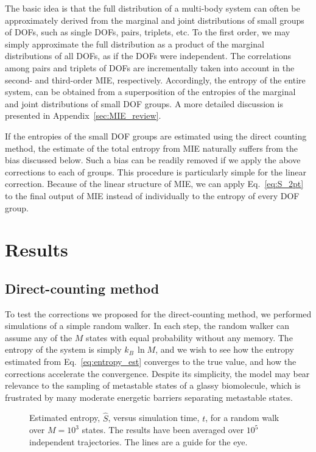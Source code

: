 \documentclass[reprint, superscriptaddress]{revtex4-1}
\begin{document}
The basic idea is that the full distribution of a multi-body system
can often be approximately derived
from the marginal and joint distributions of small groups of DOFs,
such as single DOFs, pairs, triplets, etc.
%
To the first order,
we may simply approximate the full distribution as a product
of the marginal distributions of all DOFs,
as if the DOFs were independent.
%
The correlations among pairs and triplets of DOFs
are incrementally taken into account in the second- and third-order MIE,
respectively.
%
Accordingly, the entropy of the entire system,
can be obtained from a superposition of the entropies
of the marginal and joint distributions
of small DOF groups.
%
A more detailed discussion is presented in Appendix~\ref{sec:MIE_review}.

If the entropies of the small DOF groups are estimated
using the direct counting method,
the estimate of the total entropy from MIE
naturally suffers from the bias discussed below.
%
Such a bias can be readily removed
if we apply the above corrections
to each of groups.
%
This procedure is particularly simple for the linear correction.
%
Because of the linear structure of MIE,
we can apply Eq.~\eqref{eq:S_2pt}
to the final output of MIE
instead of individually to the entropy of every DOF group.



\section{Results}

\subsection{Direct-counting method}

To test the corrections we proposed for the direct-counting method,
we performed simulations of a simple random walker.
%
In each step, the random walker can assume any of the $M$ states
with equal probability without any memory.
%
The entropy of the system is simply $k_B \, \ln M$,
and we wish to see how the entropy estimated
from Eq.~\eqref{eq:entropy_est} converges to the true value,
and how the corrections accelerate the convergence.
%
Despite its simplicity, the model may bear relevance
to the sampling of metastable states of a glassy biomolecule,
which is frustrated by many moderate energetic barriers
separating metastable states.

\begin{figure}[h]\centering
  \caption{
    \label{fig:walk_q1e3}
    Estimated entropy, $\hat S$,
    versus simulation time, $t$, for a random walk over $M = 10^3$ states.
    The results have been averaged over $10^5$ independent trajectories.
    The lines are a guide for the eye.
  }
\end{figure}
\end{document}
